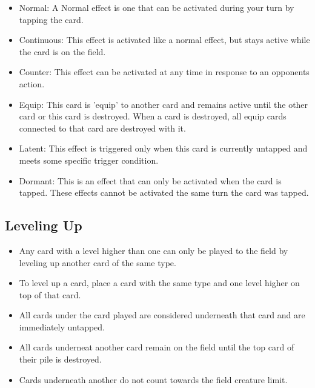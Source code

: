 \begin{itemize}
\begin{itemize}
        \item Normal: A Normal effect is one that can be activated during your turn by tapping the card.
        \item Continuous: This effect is activated like a normal effect, but stays active while the card is on the field.
		\item Counter: This effect can be activated at any time in response to an opponents action.
		\item Equip: This card is 'equip' to another card and remains active until the other card or this card is destroyed. When a card is destroyed, all equip cards connected to that card are destroyed with it.
		\item Latent: This effect is triggered only when this card is currently untapped and meets some specific trigger condition. 
		\item Dormant: This is an effect that can only be activated when the card is tapped. These effects cannot be activated the same turn the card was tapped.
    \end{itemize}
\end{itemize}








\subsection{Leveling Up}
\begin{itemize}
    \item Any card with a level higher than one can only be played to the field by leveling up another card of the same type.
    \item To level up a card, place a card with the same type and one level higher on top of that card.
    \item All cards under the card played are considered underneath that card and are immediately untapped.
    \item All cards underneat another card remain on the field until the top card of their pile is destroyed.
    \item Cards underneath another do not count towards the field creature limit.
\end{itemize}








